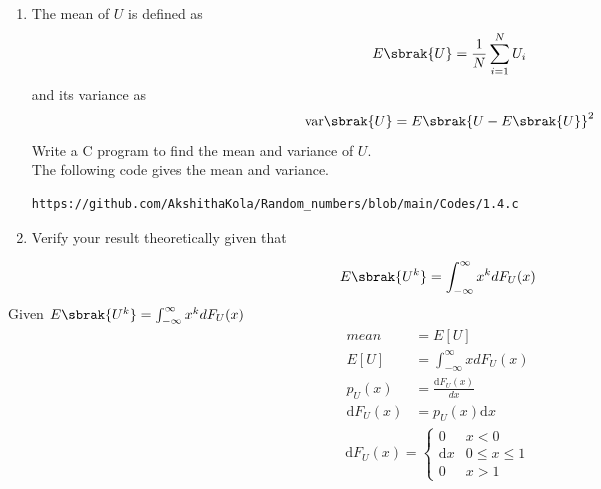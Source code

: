 \documentclass[journal,12pt,twocolumn]{IEEEtran}
\renewcommand\thesection{\arabic{section}}
\begin{document}
\begin{enumerate}[label=\thesection.\arabic*
,ref=\thesection.\theenumi]
	If $x\geq1$,
	\begin{multline}
		\int_{-\infty}^x p_{U}(x) ~\mathrm{d}x \\= \int_{-\infty}^0 0 ~\mathrm{d}x + \int_0^1 1 ~\mathrm{d}x +  \int_1^x 0 ~\mathrm{d}x 
	\end{multline}
	\begin{align}
		\int_{-\infty}^x p_{U}(x) ~\mathrm{d}x &= 0 + 1 + 0 \\
		&= 1
	\end{align}
	
	So, the CDF of $U$ is
	\begin{align}
		F_{U}(x) = 
		\begin{cases}
			0 & x < 0 \\
			x & 0 \le x \le 1 \\
			1 & x > 1
		\end{cases}
	\end{align}
\item
The mean of $U$ is defined as
%
\begin{equation}
E\sbrak{U} = \frac{1}{N}\sum_{i=1}^{N}U_i
\end{equation}
%
and its variance as
%
\begin{equation}
\text{var}\sbrak{U} = E\sbrak{U- E\sbrak{U}}^2 
\end{equation}
Write a C program to  find the mean and variance of $U$. \\
\solution The following code gives the mean and variance.
\begin{lstlisting}
https://github.com/AkshithaKola/Random_numbers/blob/main/Codes/1.4.c
\end{lstlisting}
\item Verify your result theoretically given that
\end{enumerate}
%
\begin{equation}
E\sbrak{U^k} = \int_{-\infty}^{\infty}x^kdF_{U}(x)
\end{equation}
\solution Given $E\sbrak{U^k} = \int_{-\infty}^{\infty}x^kdF_{U}(x)$ \\
\begin{align}
mean &= E[U] \\
E[U] &= \int_{-\infty}^{\infty}xdF_{U}(x) \\
p_{U}(x) &= \frac{\mathrm{d}F_{U}(x)}{dx} \\
\mathrm{d}F_{U}(x)&= p_{U}(x)\mathrm{d}x
\end{align}
\begin{align}
		\mathrm{d}F_{U}(x) = 
		\begin{cases}
			0 & x < 0 \\
			\mathrm{d}x & 0 \le x \le 1 \\
			0 & x > 1
		\end{cases}
	\end{align}
\end{document}
